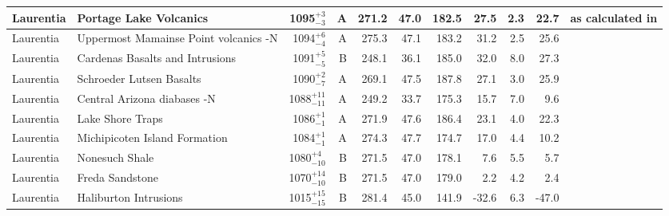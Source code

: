 \documentclass[twocolumn, switch]{article} %
\begin{document}
{\begin{landscape}
\begin{ThreePartTable}
\begin{longtable}{p{1.4 in}p{1.2 in}rrrrrrrrp{1.2 in}}
                     Laurentia &                             Portage Lake Volcanics &     1095$^{+3}_{-3}$ &      A &     271.2 &      47.0 & 182.5 &  27.5 &       2.3 &        22.7 &  \cite{Books1972a, Hnat2006a} as calculated in \cite{Swanson-Hysell2019a} \\ \hline
                     Laurentia &              Uppermost Mamainse Point volcanics -N &     1094$^{+6}_{-4}$ &      A &     275.3 &      47.1 & 183.2 &  31.2 &       2.5 &        25.6 &                         \cite{Swanson-Hysell2014a} \\ \hline
                     Laurentia &                    Cardenas Basalts and Intrusions &     1091$^{+5}_{-5}$ &      B &     248.1 &      36.1 & 185.0 &  32.0 &       8.0 &        27.3 &                                   \cite{Weil2003a} \\ \hline
                     Laurentia &                           Schroeder Lutsen Basalts &     1090$^{+2}_{-7}$ &      A &     269.1 &      47.5 & 187.8 &  27.1 &       3.0 &        25.9 &                              \cite{Fairchild2017a} \\ \hline
                     Laurentia &                        Central Arizona diabases -N &   1088$^{+11}_{-11}$ &      A &     249.2 &      33.7 & 175.3 &  15.7 &       7.0 &         9.6 &                               \cite{Donadini2011b} \\ \hline
                     Laurentia &                                   Lake Shore Traps &     1086$^{+1}_{-1}$ &      A &     271.9 &      47.6 & 186.4 &  23.1 &       4.0 &        22.3 &                                \cite{Kulakov2013a} \\ \hline
                     Laurentia &                      Michipicoten Island Formation &     1084$^{+1}_{-1}$ &      A &     274.3 &      47.7 & 174.7 &  17.0 &       4.4 &        10.2 &                              \cite{Fairchild2017a} \\ \hline
                     Laurentia &                                     Nonesuch Shale &    1080$^{+4}_{-10}$ &      B &     271.5 &      47.0 & 178.1 &   7.6 &       5.5 &         5.7 &                                  \cite{Henry1977a} \\ \hline
                     Laurentia &                                    Freda Sandstone &   1070$^{+14}_{-10}$ &      B &     271.5 &      47.0 & 179.0 &   2.2 &       4.2 &         2.4 &                                  \cite{Henry1977a} \\ \hline
                     Laurentia &                              Haliburton Intrusions &   1015$^{+15}_{-15}$ &      B &     281.4 &      45.0 & 141.9 & -32.6 &       6.3 &       -47.0 &                                \cite{Warnock2000a} \\ \hline

\end{longtable}
\end{ThreePartTable}
\end{landscape}}
\end{document}
